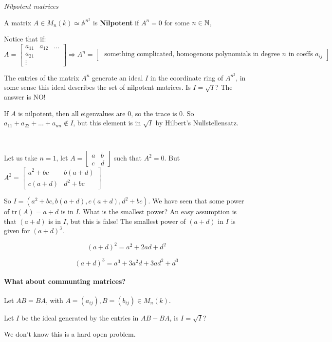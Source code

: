\begin{example}\textit{Nilpotent matrices}

    \begin{definition}
        A matrix $A\in M_n(k)\simeq\mathbb{A}^{n^2}$ is \textbf{Nilpotent} if $A^n = 0$ for some $n\in \mathbb{N}$,
    \end{definition}
 
Notice that if:\begin{equation*}
    A = \begin{bmatrix}
        a_{11} & a_{12} & \dots\\
        a_{21}\\
        \vdots
    \end{bmatrix} \Rightarrow A^n = \begin{bmatrix}
        \text{ something complicated, homogenous polynomials in degree }n\text{ in coeffs }a_{ij}
    \end{bmatrix}
\end{equation*}

The entries of the matrix $A^n$ generate an ideal $I$ in the coordinate ring of $A^{n^2}$, in some sense this ideal describes the set of nilpotent matrices. Is $I = \sqrt{I}$? The answer is NO!

If $A$ is nilpotent, then all eigenvalues are $0$, so the trace is $0$. So $a_{11}+a_{22}+\dots+a_{nn}\not\in I$, but this element is in $\sqrt{I}$ by Hilbert's Nullstellensatz.

\

Let us take $n=1$, let $A = \begin{bmatrix}
    a & b\\
    c & d
\end{bmatrix}$ such that $A^2 = 0$. But $A^2 = \begin{bmatrix}
    a^2+bc & b(a+d)\\
    c(a+d) & d^2+bc
\end{bmatrix}$

So $I = (a^2+bc, b(a+d), c(a+d), d^2+bc)$. We have seen that some power of $\text{tr}(A) = a+d$ is in $I$. What is the smallest power?
An easy assumption is that $(a+d)$ is in $I$, but this is false! The smallest power of $(a+d)$ in $I$ is given for $(a+d)^3$.

\begin{equation*}
    (a+d)^2 = a^2 + 2ad + d^2
\end{equation*}

\begin{equation}
    (a+d)^3 = a^3+3a^2d+3ad^2+d^3
\end{equation}

\end{example}

\paragraph*{What about communting matrices?}
\begin{example}
    Let $AB=BA$, with $A=(a_{ij}),B=(b_{ij})\in M_n(k)$.

    Let $I$ be the ideal generated by the entries in $AB-BA$, is $I = \sqrt{I}$?

    We don't know this is a hard open problem.
\end{example}

